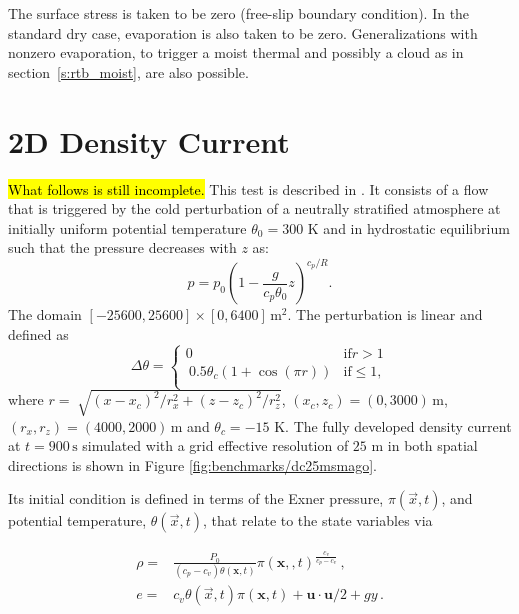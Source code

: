 \documentclass{report}
\begin{document}
The surface stress is taken to be zero (free-slip boundary condition). In the standard dry case, evaporation is also taken to be zero. Generalizations with nonzero evaporation, to trigger a moist thermal and possibly a cloud as in section~\ref{s:rtb_moist}, are also possible. 

\section{2D Density Current}

\hl{What follows is still incomplete.}
This test is described in \cite{strakaWilhelmson1993}. It consists of a flow that is triggered by the cold perturbation of a neutrally stratified atmosphere at initially uniform potential temperature $\theta_0 = 300$ K
and in hydrostatic equilibrium such that the pressure decreases with $z$ as:
\begin{equation}
\label{pressureDistrib2}
p = p_{0}\left(1-\frac{g}{c_p{\theta_{0}}}z\right)^{c_p/R}.
\end{equation}
The domain $[-25600,25600]\times[0,6400]\,\mathrm{m}^2$.
The perturbation is linear and defined as
\begin{equation}
 \Delta\theta = \left\{ \begin{array}{lr}
 0 & \mathrm{if } r > 1\\\
 0.5 \theta_c \left(1 + \cos(\pi r) \right) & \mathrm{if } \leq 1,\\
\end{array} \right.
\label{e:robertIni2}
\end{equation}
where $r = \sqrt[]{(x-x_{c})^2/r_x^{2} + (z-z_{c})^{2}/r_z^2}$, $(x_c,z_c) = (0,3000)\,\mathrm{m}$, $(r_x, r_z) = (4000, 2000)\,\mathrm{m}$ and $\theta_c=-15$ K. The fully developed density current at $t=900\,\mathrm{s}$ simulated with a grid effective resolution of $25$ m in both spatial directions is shown in Figure \ref{fig:benchmarks/dc25msmago}.

Its initial condition is defined in terms of the Exner pressure, $\pi(\vec{x},t)$, and potential temperature, $\theta(\vec{x},t)$, that relate to the state variables via

\begin{subequations}
\begin{align}
\rho=& \frac{P_0}{( c_p - c_v)\theta(\boldsymbol{x},t)} \pi(\boldsymbol{x},,t)^{\frac{c_v}{ c_p - c_v}} \, ,\\
e =& c_v \theta(\vec{x},t) \pi(\boldsymbol{x},t) + \boldsymbol{u}\cdot \boldsymbol{u} /2 + g y \, .
\end{align}
\end{subequations}
\end{document}

